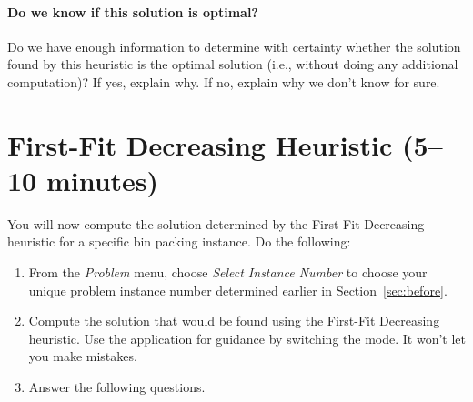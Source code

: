 \documentclass[11pt,letterpaper]{article}
\begin{document}
\paragraph*{Do we know if this solution is optimal?} Do we have enough 
information to determine with certainty whether the solution found by
this heuristic is the optimal solution (i.e., without doing any additional
computation)? If yes, explain why. If no, explain why we don't know for sure.

\vspace*{0.5in}



\section{First-Fit Decreasing Heuristic (5--10 minutes)}\label{sec:ffd}


You will now compute the solution determined by the First-Fit Decreasing
heuristic for a specific bin packing instance. Do the following:
\begin{enumerate}[leftmargin=*, parsep=0pt, itemsep=2pt, topsep=2pt, partopsep=0pt]
\item From the {\em Problem} menu, choose {\em Select Instance Number}
to choose your unique problem instance number determined earlier in 
Section~\ref{sec:before}.
\item Compute the solution that would be found using the First-Fit Decreasing
heuristic. Use the application for guidance by switching the mode.
It won't let you make mistakes.
\item Answer the following questions.
\end{enumerate}
\end{document}
